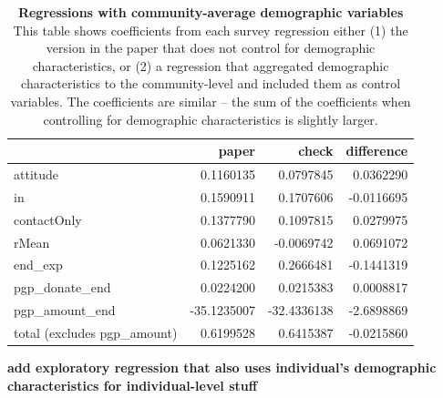 \documentclass[
]{article}
\begin{document}
\begin{table}[H]
\begin{center}
\label{tab:comp_df1}
\caption{\textbf{Regressions with community-average demographic variables} This table shows coefficients from each survey regression either (1) the version in the paper that does not control for demographic characteristics, or (2) a regression that aggregated demographic characteristics to the community-level and included them as control variables. The coefficients are similar -- the sum of the coefficients when controlling for demographic characteristics is slightly larger.}
\smallskip

\begin{tabular}{l|r|r|r}
\hline
  & paper & check & difference\\
\hline
attitude & 0.1160135 & 0.0797845 & 0.0362290\\
\hline
in & 0.1590911 & 0.1707606 & -0.0116695\\
\hline
contactOnly & 0.1377790 & 0.1097815 & 0.0279975\\
\hline
rMean & 0.0621330 & -0.0069742 & 0.0691072\\
\hline
end\_exp & 0.1225162 & 0.2666481 & -0.1441319\\
\hline
pgp\_donate\_end & 0.0224200 & 0.0215383 & 0.0008817\\
\hline
pgp\_amount\_end & -35.1235007 & -32.4336138 & -2.6898869\\
\hline
total (excludes pgp\_amount) & 0.6199528 & 0.6415387 & -0.0215860\\
\hline
\end{tabular}


\end{center}
\end{table}

\textbf{add exploratory regression that also uses individual's
demographic characteristics for individual-level stuff}
\end{document}
